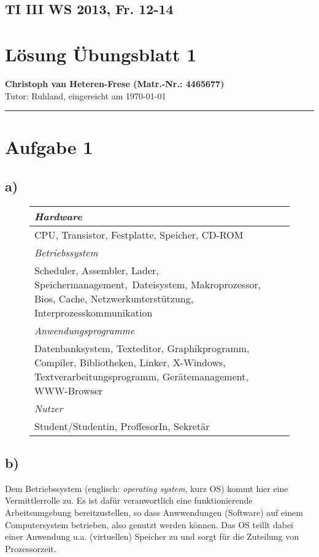 \documentclass[11pt, a4paper]{scrartcl}
\begin{document}
\onecolumn
\subsection*{TI III WS 2013, Fr. 12-14}
\section*{Lösung Übungsblatt 1}
\textbf{Christoph van Heteren-Frese (Matr.-Nr.: 4465677)} \\ %
Tutor: Ruhland, eingereicht am \today\\
\hrule

\section*{Aufgabe 1}
\subsection*{a)}
\begin{figure}[H]
\center
\begin{tabular}{p{12cm}}
\toprule
\textit{Hardware} \\
\midrule 
CPU, Transistor, Festplatte, Spei\-cher, CD-ROM \\ 
\bottomrule \addlinespace
\textit{Betriebssystem} \\
\midrule
Scheduler, Assemb\-ler, Lader, Speichermanage\-ment,~Da\-tei\-sys\-tem, Makro\-pro\-zess\-or, Bios, Cache, Netz\-werk\-un\-ter\-stütz\-ung, Interprozesskommunikation\\
\bottomrule \addlinespace
\textit{Anwendungs\-pro\-gram\-me} \\
\midrule
Datenbanksystem, Texteditor, Graphikprogramm, Compil\-er, Bibliotheken, Linker, X-Windows, Text\-ver\-ar\-bei\-tungs\-pro\-gramm, Gerätemanagement, WWW-Browser\\
\bottomrule \addlinespace
\textit{Nutzer} \\
\midrule
Student/Studentin, ProffesorIn, Sekretär\\
\bottomrule
\end{tabular}
\end{figure}
\subsection*{b)}
Dem Betriebssystem (englisch: \textit{operating system}, kurz OS) kommt hier eine Vermittlerrolle zu. Es ist dafür veranwortlich eine funktionierende Arbeitsumgebung be\-reit\-zustellen, so dass Anwwendungen (Software) auf einem Computersystem \glqq betrieben\grqq, also genutzt werden können. Das OS teillt dabei einer Anwendung u.a. (virtuellen) Speicher zu und sorgt für die Zuteilung von Prozessorzeit.
\end{document}
